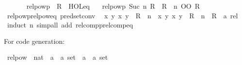 \begin{isabellebody}
\ \ \isanewline
\ \ \ \ {\isachardoublequoteopen}relpowp\ {}\ R\ {\isacharequal}{\kern0pt}\ HOL{\isachardot}{\kern0pt}eq{\isachardoublequoteclose}\isanewline
\ \ {\isacharbar}{\kern0pt}\ {\isachardoublequoteopen}relpowp\ {\isacharparenleft}{\kern0pt}Suc\ n{\isacharparenright}{\kern0pt}\ R\ {\isacharequal}{\kern0pt}\ {\isacharparenleft}{\kern0pt}R\ {\isacharcircum}{\kern0pt}{\isacharcircum}{\kern0pt}\ n{\isacharparenright}{\kern0pt}\ OO\ R{\isachardoublequoteclose}\isanewline
\isanewline
{}\isamarkupfalse%
\isanewline
\isanewline
{}\isamarkupfalse%
\ relpowp{\isacharunderscore}{\kern0pt}relpow{\isacharunderscore}{\kern0pt}eq\ {\isacharbrackleft}{\kern0pt}pred{\isacharunderscore}{\kern0pt}set{\isacharunderscore}{\kern0pt}conv{\isacharbrackright}{\kern0pt}{\isacharcolon}{\kern0pt}\isanewline
\ \ {\isachardoublequoteopen}{\isacharparenleft}{\kern0pt}{\isasymlambda}x\ y{\isachardot}{\kern0pt}\ {\isacharparenleft}{\kern0pt}x{\isacharcomma}{\kern0pt}\ y{\isacharparenright}{\kern0pt}\ {\isasymin}\ R{\isacharparenright}{\kern0pt}\ {\isacharcircum}{\kern0pt}{\isacharcircum}{\kern0pt}\ n\ {\isacharequal}{\kern0pt}\ {\isacharparenleft}{\kern0pt}{\isasymlambda}x\ y{\isachardot}{\kern0pt}\ {\isacharparenleft}{\kern0pt}x{\isacharcomma}{\kern0pt}\ y{\isacharparenright}{\kern0pt}\ {\isasymin}\ R\ {\isacharcircum}{\kern0pt}{\isacharcircum}{\kern0pt}\ n{\isacharparenright}{\kern0pt}{\isachardoublequoteclose}\ \ R\ {\isacharcolon}{\kern0pt}{\isacharcolon}{\kern0pt}\ {\isachardoublequoteopen}{\isacharprime}{\kern0pt}a\ rel{\isachardoublequoteclose}\isanewline
%
\isadelimproof
\ \ %
\endisadelimproof
%
\isatagproof
{}\isamarkupfalse%
\ {\isacharparenleft}{\kern0pt}induct\ n{\isacharparenright}{\kern0pt}\ {\isacharparenleft}{\kern0pt}simp{\isacharunderscore}{\kern0pt}all\ add{\isacharcolon}{\kern0pt}\ relcompp{\isacharunderscore}{\kern0pt}relcomp{\isacharunderscore}{\kern0pt}eq{\isacharparenright}{\kern0pt}%
\endisatagproof
{\isafoldproof}%
%
\isadelimproof
%
\endisadelimproof
%
\begin{isamarkuptext}%
For code generation:%
\end{isamarkuptext}\isamarkuptrue%
\isamarkupfalse%
\ relpow\ {\isacharcolon}{\kern0pt}{\isacharcolon}{\kern0pt}\ {\isachardoublequoteopen}nat\ {\isasymRightarrow}\ {\isacharparenleft}{\kern0pt}{\isacharprime}{\kern0pt}a\ {\isasymtimes}\ {\isacharprime}{\kern0pt}a{\isacharparenright}{\kern0pt}\ set\ {\isasymRightarrow}\ {\isacharparenleft}{\kern0pt}{\isacharprime}{\kern0pt}a\ {\isasymtimes}\ {\isacharprime}{\kern0pt}a{\isacharparenright}{\kern0pt}\ set{\isachardoublequoteclose}\isanewline

\end{isabellebody}
